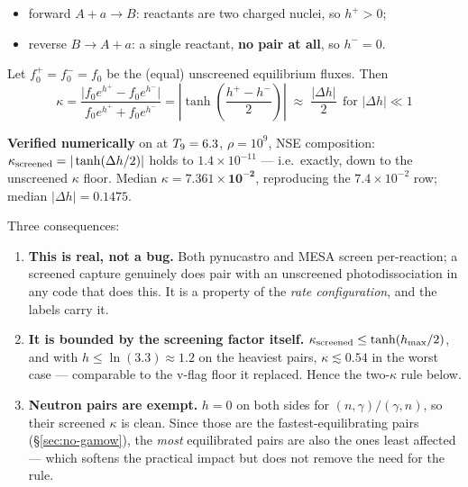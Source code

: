 \begin{itemize}
\item forward $A + a \to B$: reactants are two charged nuclei, so $h^+ > 0$;
\item reverse $B \to A + a$: a single reactant, \textbf{no pair at all}, so
      $h^- = 0$.
\end{itemize}

Let $f^+_0 = f^-_0 = f_0$ be the (equal) unscreened equilibrium fluxes. Then
%
\begin{equation}
\kappa
= \frac{\bigl|f_0e^{h^+} - f_0e^{h^-}\bigr|}{f_0e^{h^+} + f_0e^{h^-}}
= \left|\tanh\!\left(\frac{h^+-h^-}{2}\right)\right|
\;\approx\; \frac{|\Delta h|}{2}\ \ \text{for } |\Delta h|\ll 1
\label{eq:screenedkappa}
\end{equation}

\textbf{Verified numerically} on  at $T_{9} = 6.3$, $\rho = 10^9$, NSE
composition: $\kappa_{\rm screened} = |\tanh(\Delta h/2)|$ holds to
$1.4\times10^{-11}$ --- i.e.\ exactly, down to the unscreened $\kappa$ floor.
Median $\kappa = \mathbf{7.361\times10^{-2}}$, reproducing the 
$7.4\times10^{-2}$ row; median $|\Delta h| = 0.1475$. \derivedhere

Three consequences:

\begin{enumerate}
\item \textbf{This is real, not a bug.} Both pynucastro and MESA
       screen per-reaction; a screened capture genuinely does
      pair with an unscreened photodissociation in any code that does this. It
      is a property of the \emph{rate configuration}, and the labels carry it.
\item \textbf{It is bounded by the screening factor itself.}
      $\kappa_{\rm screened} \le \tanh(h_{\max}/2)$, and with
      $h \le \ln(3.3) \approx 1.2$ on the heaviest pairs,
      $\kappa \lesssim 0.54$ in the worst case --- comparable to the v-flag
      floor it replaced. Hence the two-$\kappa$ rule below.
\item \textbf{Neutron pairs are exempt.} $h = 0$ on both sides for
      $(n,\gamma)/(\gamma,n)$, so their screened $\kappa$ is clean. Since those
      are the fastest-equilibrating pairs (\S\ref{sec:no-gamow}), the
      \emph{most} equilibrated pairs are also the ones least affected --- which
      softens the practical impact but does not remove the need for the rule.
\end{enumerate}


